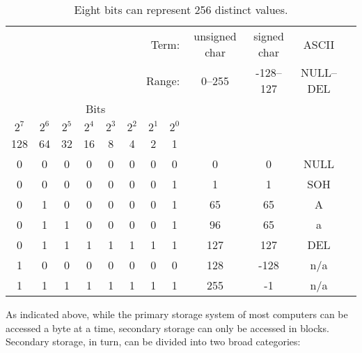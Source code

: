 \begin{table}
\begin{tabular}{cccccccc|c|c|c|c}
\multicolumn{8}{r}{                       Term:}  & unsigned char & signed char & ASCII \\
\multicolumn{8}{r}{                       Range:} & 0--255      & -128--127 & NULL--DEL\\
\cline{9-11}\multicolumn{8}{c}{Bits}                          &        &               &             &          \\
$2^7$ & $2^6$ & $2^5$ & $2^4$ & $2^3$ & $2^2$ & $2^1$ & $2^0$  &        &               &             &          \\
  128 &    64 &   32 &    16 &     8 &     4 &     2 &     1  &        &               &             &          \\
\hline
    0 &     0 &    0 &     0 &     0 &     0 &     0 &     0 &            0  &            0  &   NULL     \\
    0 &     0 &    0 &     0 &     0 &     0 &     0 &     1 &            1  &            1  &   SOH      \\
    0 &     1 &    0 &     0 &     0 &     0 &     0 &     1 &           65  &           65  &   A        \\
    0 &     1 &    1 &     0 &     0 &     0 &     0 &     1 &           96  &           65  &   a        \\
    0 &     1 &    1 &     1 &     1 &     1 &     1 &     1 &           127 &          127  &   DEL      \\
    1 &     0 &    0 &     0 &     0 &     0 &     0 &     0 &           128 &         -128  &   n/a      \\
    1 &     1 &    1 &     1 &     1 &     1 &     1 &     1 &           255 &           -1  &   n/a      \\
\end{tabular}
\caption{Eight bits can represent 256 distinct values.}\label{tab:8bits}
\end{table}

As indicated above, while the primary storage system of most computers can be accessed a
byte at a time, secondary storage can only be accessed in
blocks. Secondary storage, in turn, can be divided into two broad
categories:

